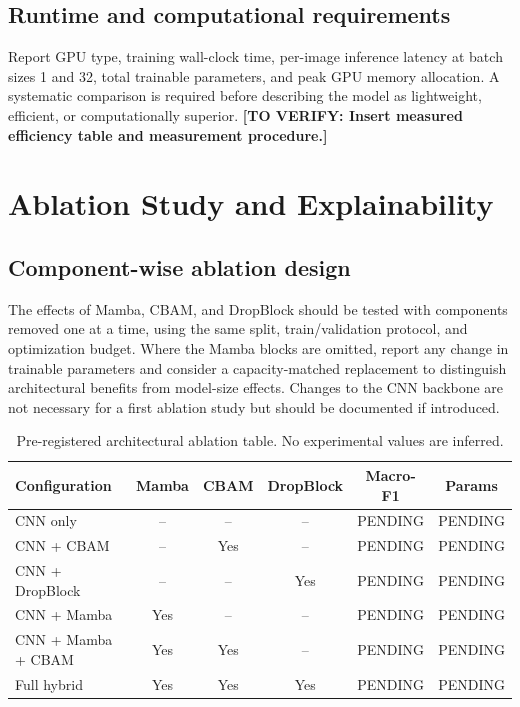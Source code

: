 \documentclass[11pt,a4paper]{article}
\newcommand{\todo}[1]{\textcolor{red!70!black}{\textbf{[TO VERIFY: #1]}}}
\newcommand{\pending}{\textsf{PENDING}}
\begin{document}
\subsection{Runtime and computational requirements}
Report GPU type, training wall-clock time, per-image inference latency at batch sizes 1 and 32, total trainable parameters, and peak GPU memory allocation. A systematic comparison is required before describing the model as lightweight, efficient, or computationally superior. \todo{Insert measured efficiency table and measurement procedure.}

\section{Ablation Study and Explainability}\label{sec:ablation}
\subsection{Component-wise ablation design}
The effects of Mamba, CBAM, and DropBlock should be tested with components removed one at a time, using the same split, train/validation protocol, and optimization budget. Where the Mamba blocks are omitted, report any change in trainable parameters and consider a capacity-matched replacement to distinguish architectural benefits from model-size effects. Changes to the CNN backbone are not necessary for a first ablation study but should be documented if introduced.

\begin{table}[h]
\centering\small
\caption{Pre-registered architectural ablation table. No experimental values are inferred.}
\label{tab:ablations}
\begin{tabular}{lccccc}
\toprule
Configuration & Mamba & CBAM & DropBlock & Macro-F1 & Params\\
\midrule
CNN only & -- & -- & -- & \pending & \pending\\
CNN + CBAM & -- & Yes & -- & \pending & \pending\\
CNN + DropBlock & -- & -- & Yes & \pending & \pending\\
CNN + Mamba & Yes & -- & -- & \pending & \pending\\
CNN + Mamba + CBAM & Yes & Yes & -- & \pending & \pending\\
Full hybrid & Yes & Yes & Yes & \pending & \pending\\
\bottomrule
\end{tabular}
\end{table}
\end{document}

